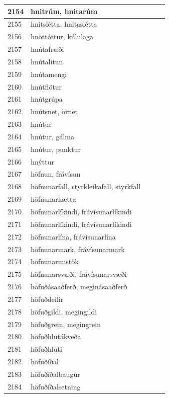 \begin{longtable}{p{}|p{}|p{}|p{}|p{}}
\hline
2154 & hnitrúm, hnitarúm &  &  &  \\
\hline
2155 & hnitslétta, hnitaslétta &  &  &  \\
\hline
2156 & hnöttóttur, kúlulaga &  &  &  \\
\hline
2157 & hnútafræði &  &  &  \\
\hline
2158 & hnútalitun &  &  &  \\
\hline
2159 & hnútamengi &  &  &  \\
\hline
2160 & hnútflötur &  &  &  \\
\hline
2161 & hnútgrúpa &  &  &  \\
\hline
2162 & hnútsnet, örnet &  &  &  \\
\hline
2163 & hnútur &  &  &  \\
\hline
2164 & hnútur, gálma &  &  &  \\
\hline
2165 & hnútur, punktur &  &  &  \\
\hline
2166 & hnýttur &  &  &  \\
\hline
2167 & höfnun, frávísun &  &  &  \\
\hline
2168 & höfnunarfall, styrkleikafall, styrkfall &  &  &  \\
\hline
2169 & höfnunarhætta &  &  &  \\
\hline
2170 & höfnunarlíkindi, frávísunarlíkindi &  &  &  \\
\hline
2171 & höfnunarlíkindi, frávísunarlíkindi &  &  &  \\
\hline
2172 & höfnunarlína, frávísunarlína &  &  &  \\
\hline
2173 & höfnunarmark, frávísunarmark &  &  &  \\
\hline
2174 & höfnunarmistök &  &  &  \\
\hline
2175 & höfnunarsvæði, frávísunarsvæði &  &  &  \\
\hline
2176 & höfuðásaaðferð, meginásaaðferð &  &  &  \\
\hline
2177 & höfuðdeilir &  &  &  \\
\hline
2178 & höfuðgildi, megingildi &  &  &  \\
\hline
2179 & höfuðgrein, megingrein &  &  &  \\
\hline
2180 & höfuðhlutákveða &  &  &  \\
\hline
2181 & höfuðhluti &  &  &  \\
\hline
2182 & höfuðíðal &  &  &  \\
\hline
2183 & höfuðíðalbaugur &  &  &  \\
\hline
2184 & höfuðíðalsetning &  &  &  \\

\end{longtable}
